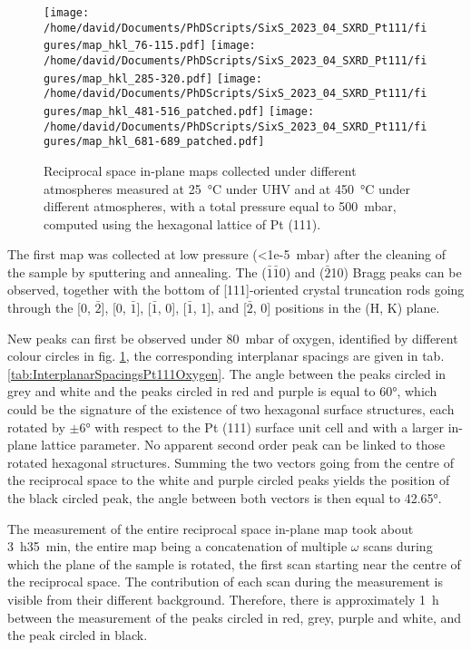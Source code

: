 \begin{figure}[!htb]
    \centering
    \texttt{[image: /home/david/Documents/PhDScripts/SixS\_2023\_04\_SXRD\_Pt111/figures/map\_hkl\_76-115.pdf]}
    \texttt{[image: /home/david/Documents/PhDScripts/SixS\_2023\_04\_SXRD\_Pt111/figures/map\_hkl\_285-320.pdf]}
    \texttt{[image: /home/david/Documents/PhDScripts/SixS\_2023\_04\_SXRD\_Pt111/figures/map\_hkl\_481-516\_patched.pdf]}
    \texttt{[image: /home/david/Documents/PhDScripts/SixS\_2023\_04\_SXRD\_Pt111/figures/map\_hkl\_681-689\_patched.pdf]}
    \caption{
        Reciprocal space in-plane maps collected under different atmospheres measured at \qty{25}{\degreeCelsius} under UHV and at \qty{450}{\degreeCelsius} under different atmospheres, with a total pressure equal to \qty{500}{\milli\bar}, computed using the hexagonal lattice of Pt (111).
    }
    \label{fig:MapsPt111A}
\end{figure}

The first map was collected at low pressure (\qty{<1e-5}{\milli\bar}) after the cleaning of the sample by sputtering and annealing.
The ($\bar{1}$$\bar{1}$0) and ($\bar{2}$10) Bragg peaks can be observed, together with the bottom of [111]-oriented crystal truncation rods going through the [0, $\bar{2}$], [0, $\bar{1}$], [$\bar{1}$, 0], [$\bar{1}$, 1], and [$\bar{2}$, 0] positions in the (H, K) plane.

New peaks can first be observed under \qty{80}{\milli\bar} of oxygen, identified by different colour circles in fig. \ref{fig:MapsPt111A}, the corresponding interplanar spacings are given in tab. \ref{tab:InterplanarSpacingsPt111Oxygen}.
The angle between the peaks circled in grey and white and the peaks circled in red and purple is equal to \ang{60}, which could be the signature of the existence of two hexagonal surface structures, each rotated by $\pm \ang{6}$ with respect to the Pt (111) surface unit cell and with a larger in-plane lattice parameter.
No apparent second order peak can be linked to those rotated hexagonal structures.
Summing the two vectors going from the centre of the reciprocal space to the white and purple circled peaks yields the position of the black circled peak, the angle between both vectors is then equal to \ang{42.65}.

The measurement of the entire reciprocal space in-plane map took about \qty{3}{\hour}\qty{35}{\minute}, the entire map being a concatenation of multiple $\omega$ scans during which the plane of the sample is rotated, the first scan starting near the centre of the reciprocal space.
The contribution of each scan during the measurement is visible from their different background.
Therefore, there is approximately \qty{1}{\hour} between the measurement of the peaks circled in red, grey, purple and white, and the peak circled in black.


